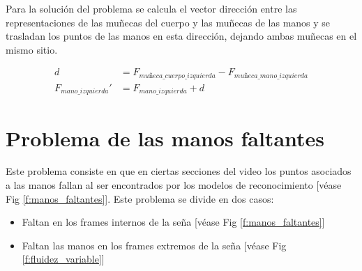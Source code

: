 Para la solución del problema se calcula el vector dirección entre las representaciones de las muñecas del cuerpo 
y las muñecas de las manos y se trasladan los puntos de las manos en esta dirección, dejando ambas muñecas en el 
mismo sitio.

\begin{align}
d &= F_{muñeca\_cuerpo\_izquierda} - F_{muñeca\_mano\_izquierda} \\
F_{mano\_izquierda}' &= F_{mano\_izquierda} + d
\end{align}

\section{Problema de las manos faltantes}

Este problema consiste en que en ciertas secciones del video los puntos asociados a las manos fallan al ser 
encontrados por los modelos de reconocimiento [véase Fig \ref{f:manos_faltantes}]. Este problema se divide en dos casos:

\begin{itemize}
\item Faltan en los frames internos de la seña [véase Fig \ref{f:manos_faltantes}]
\item Faltan las manos en los frames extremos de la seña [véase Fig \ref{f:fluidez_variable}]
\end{itemize}

